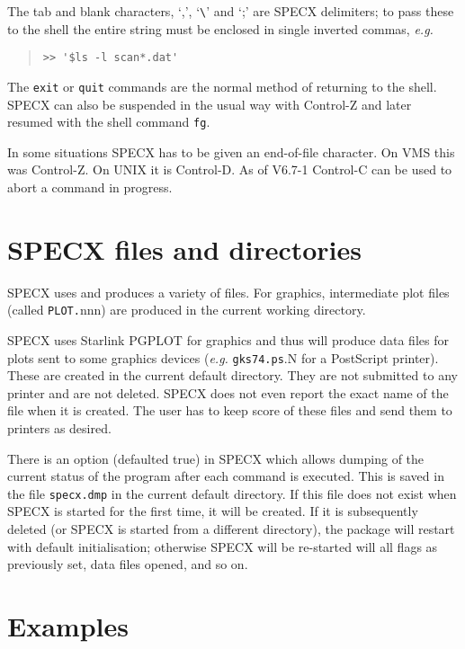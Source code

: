 \documentclass[twoside,11pt]{article}
\renewcommand{\_}{\texttt{\symbol{95}}}
\newenvironment{myquote}{\begin{quote}\begin{small}}{\end{small}\end{quote}}
\begin{document}
The tab and blank characters, `,', `\verb+\+' and `;' are SPECX delimiters;
to pass these to the shell the entire string must be enclosed in single 
inverted commas, {\em e.g.}

\begin{myquote}
\begin{verbatim}
>> '$ls -l scan*.dat'
\end{verbatim}
\end{myquote}

The {\tt exit} or \texttt{quit} commands are the normal method of returning to
the shell.  SPECX can also be suspended in the usual way with Control-Z and
later resumed with the shell command {\tt fg}.

In some situations SPECX has to be given an end-of-file character. On
VMS this was Control-Z. On UNIX it is Control-D. As of V6.7-1 Control-C
can be used to abort a command in progress.


\section {SPECX files and directories}

SPECX uses and produces a variety of files. For graphics, 
intermediate plot files (called {\tt PLOT.}nnn) are produced in the
current working directory.

SPECX uses Starlink PGPLOT for graphics and thus will produce data files for
plots sent to some graphics devices ({\em e.g.} {\tt gks74.ps}.N for a
PostScript printer). These are created in the current default directory. They
are not submitted to any printer and are not deleted. SPECX does not even
report the exact name of the file when it is created. The user has to keep
score of these files and send them to printers as desired.

There is an option (defaulted true) in SPECX which allows dumping of the
current status of the program after each command is executed. This is saved in
the file {\tt specx.dmp} in the current default directory. If this file does
not exist when SPECX is started for the first time, it will be created. If it
is subsequently deleted (or SPECX is started from a different directory), the
package will restart with default initialisation; otherwise SPECX will be
re-started will all flags as previously set, data files opened, and so on.


\section {Examples}
\end{document}

